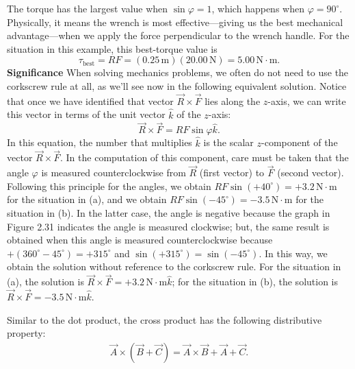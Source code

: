 \documentclass{report}
\begin{document}
    The torque has the largest value when $\sin\varphi=1$, which happens when $\varphi=90^\circ$. Physically, it means the wrench is most effective---giving us the best mechanical advantage---when we apply the force perpendicular to the wrench handle. For the situation in this example, this best-torque value is
    \[
        \tau_{\text{best}} = RF = (0.25\,\text{m})(20.00\,\text{N}) = 5.00\,\text{N}\cdot\text{m}.
    \]
    \bigbreak \noindent 
    \textbf{Significance}
    \bigbreak \noindent 
    When solving mechanics problems, we often do not need to use the corkscrew rule at all, as we'll see now in the following equivalent solution. Notice that once we have identified that vector $\vec{R} \times \vec{F}$ lies along the $z$-axis, we can write this vector in terms of the unit vector $\hat{k}$ of the $z$-axis:
    \[
        \vec{R} \times \vec{F} = RF\sin\varphi\hat{k}.
    \]
    In this equation, the number that multiplies $\hat{k}$ is the scalar $z$-component of the vector $\vec{R} \times \vec{F}$. In the computation of this component, care must be taken that the angle $\varphi$ is measured counterclockwise from $\vec{R}$ (first vector) to $\vec{F}$ (second vector). Following this principle for the angles, we obtain $RF\sin(+40^\circ)=+3.2\,\text{N}\cdot\text{m}$ for the situation in (a), and we obtain $RF\sin(-45^\circ)=-3.5\,\text{N}\cdot\text{m}$ for the situation in (b). In the latter case, the angle is negative because the graph in Figure 2.31 indicates the angle is measured clockwise; but, the same result is obtained when this angle is measured counterclockwise because $+(360^\circ-45^\circ)=+315^\circ$ and $\sin(+315^\circ)=\sin(-45^\circ)$. In this way, we obtain the solution without reference to the corkscrew rule. For the situation in (a), the solution is $\vec{R} \times \vec{F} =+3.2\,\text{N}\cdot\text{m}\hat{k}$; for the situation in (b), the solution is $\vec{R} \times \vec{F} =-3.5\,\text{N}\cdot\text{m}\hat{k}$.
    \bigbreak \noindent 
    \begin{thrmm}
        Similar to the dot product, the cross product has the following distributive property:
        \begin{align*}
            \vec{A} \times (\vec{B} + \vec{C}) = \vec{A} \times \vec{B} + \vec{A} + \vec{C}
        .\end{align*}
        
    \end{thrmm}
    


    



    
\end{document}
